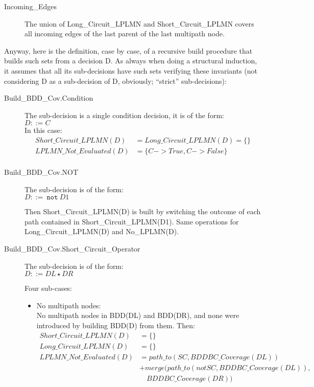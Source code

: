 \documentclass[a4paper,12pt,twoside]{article}
\newcommand{\anysc}{\star}
\newcommand{\adanot}{\texttt{not}}
\begin{document}
\begin{description}
\item[Incoming\_Edges]
  The union of Long\_Circuit\_LPLMN and Short\_Circuit\_LPLMN covers all incoming
  edges of the last parent of the last multipath node.
\end{description}

Anyway, here is the definition, case by case, of a recursive build
procedure that builds such sets from a decision D. As always when
doing a structural induction, it assumes that all its sub-decisions
have such sets verifying these invariants (not considering D as a
sub-decision of D, obviously; ``strict'' sub-decisions):

\begin{description}
\item[Build\_BDD\_Cov.Condition]
  The sub-decision is a single condition decision, it is of the form:\\
  $D ::= C$\\
  In this case:
  \begin{align*}
    Short\_Circuit\_LPLMN(D) & = Long\_Circuit\_LPLMN(D) = \{\}\\
    LPLMN\_Not\_Evaluated(D) & = \{C -> True, C -> False\}\\
  \end{align*}


\item[Build\_BDD\_Cov.NOT]
  The sub-decision is of the form:\\
  $D ::=\ \adanot{} \ D1$

  Then Short\_Circuit\_LPLMN(D) is built by switching the outcome of each
  path contained in Short\_Circuit\_LPLMN(D1). Same operations for
  Long\_Circuit\_LPLMN(D) and No\_LPLMN(D).


\item[Build\_BDD\_Cov.Short\_Circuit\_Operator]
  The sub-decision is of the form:\\
  $D ::= DL \anysc{} DR$

  Four sub-cases:

  \begin{itemize}
  \item No multipath nodes:\\
    No multipath nodes in BDD(DL) and BDD(DR), and none were introduced
    by building BDD(D) from them. Then:\\
    \begin{align*}
      Short\_Circuit\_LPLMN(D) & = \{\}\\
      Long\_Circuit\_LPLMN (D) & = \{\}\\
      LPLMN\_Not\_Evaluated(D) & = path\_to(SC, BDDBC\_Coverage(DL))\\
                            & + merge(path\_to(not SC, BDDBC\_Coverage (DL)),\\
                            & \quad BDDBC\_Coverage(DR))
    \end{align*}


\end{itemize}
\end{description}
\end{document}
